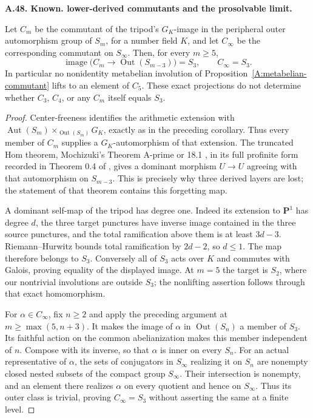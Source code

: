 \documentclass[11pt,oneside]{article}
\makeatletter
\newcounter{statementanchor}
\newenvironment{statement}[3]{%
 \refstepcounter{statementanchor}\def\@currentlabel{#1}%
 \par\addvspace{9pt}\noindent
 \textbf{#1. #2. #3.}\par\nobreak\noindent\ignorespaces
}{\par\addvspace{5pt}}
\makeatother
\begin{document}
\begin{statement}{A.48}{Known}{lower-derived commutants and the prosolvable limit}
\label{st:A.48}
\label{A:solvable-projection-limit}
Let $C_m$ be the commutant of the tripod's $G_K$-image in
the peripheral outer automorphism group of $S_m$, for a
number field $K$, and let $C_\infty$ be the corresponding
commutant on $S_\infty$. Then, for every $m\ge5$,
\[
 \operatorname{image}\bigl(C_m\to\operatorname{Out}(S_{m-3})\bigr)
                   =S_3,
       \qquad C_\infty=S_3.
\]
In particular no nonidentity metabelian involution of
Proposition~\ref{A:metabelian-commutant} lifts to an element
of $C_5$. These exact projections do not determine whether
$C_3$, $C_4$, or any $C_m$ itself equals $S_3$.
\end{statement}
\begin{proof}
Center-freeness identifies the arithmetic extension with
$\operatorname{Aut}(S_m)\times_{\operatorname{Out}(S_m)}G_K$,
exactly as in the preceding corollary. Thus every member of
$C_m$ supplies a $G_K$-automorphism of that extension.
The truncated Hom theorem, Mochizuki's Theorem A-prime or
18.1 \cite{A_Mochizuki1999}, in its full profinite form
recorded in Theorem 0.4 of \cite{A_Yamaguchi2024}, gives a
dominant morphism $U\to U$ agreeing with that automorphism
on $S_{m-3}$. This is precisely why three derived layers
are lost; the statement of that theorem contains this
forgetting map.

A dominant self-map of the tripod has degree one. Indeed
its extension to $\mathbf P^1$ has degree $d$, the three
target punctures have inverse image contained in the three
source punctures, and the total ramification above them
is at least $3d-3$. Riemann--Hurwitz bounds total
ramification by $2d-2$, so $d\le1$. The map therefore
belongs to $S_3$. Conversely all of $S_3$ acts over $K$
and commutes with Galois, proving equality of the displayed
image. At $m=5$ the target is $S_2$, where our nontrivial
involutions are outside $S_3$; the nonlifting assertion
follows through that exact homomorphism.

For $\alpha\in C_\infty$, fix $n\ge2$ and apply the
preceding argument at $m\ge\max(5,n+3)$. It makes the
image of $\alpha$ in $\operatorname{Out}(S_n)$ a member
of $S_3$. Its faithful action on the common abelianization
makes this member independent of $n$. Compose with its
inverse, so that $\alpha$ is inner on every $S_n$.
For an actual representative of $\alpha$, the sets of
conjugators in $S_\infty$ realizing it on $S_n$ are
nonempty closed nested subsets of the compact group
$S_\infty$. Their intersection is nonempty, and an element
there realizes $\alpha$ on every quotient and hence on
$S_\infty$. Thus its outer class is trivial, proving
$C_\infty=S_3$ without asserting the same at a finite
level.
\end{proof}
\end{document}
